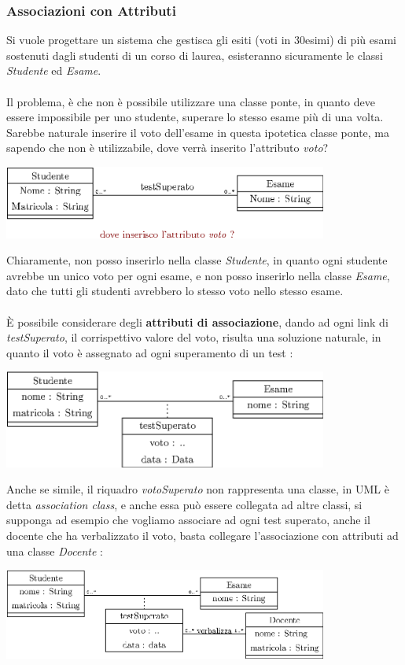 \documentclass[12pt, letterpaper]{article}
\newcommand{\acc}{\\\hphantom{}\\}
\begin{document}
\subsubsection{Associazioni con Attributi}
Si vuole progettare un sistema che gestisca gli esiti (voti in 30esimi) di
più esami sostenuti dagli studenti di un corso di laurea, esisteranno sicuramente
le classi \textit{Studente} ed \textit{Esame}.\acc
Il problema, è che non è possibile utilizzare una classe ponte, in quanto
deve essere impossibile per uno studente, superare lo stesso esame più di una volta. Sarebbe
naturale inserire il voto dell'esame in questa ipotetica classe ponte, ma sapendo che non
è utilizzabile, dove verrà inserito l'attributo \textit{voto}?
\begin{center}
    \includegraphics[width=0.8\textwidth ]{images/votoSbagliato.eps}
\end{center}
Chiaramente, non posso inserirlo nella classe \textit{Studente}, in quanto
ogni studente avrebbe un unico voto per ogni esame, e non posso inserirlo
nella classe \textit{Esame}, dato che tutti gli studenti avrebbero lo
stesso voto nello stesso esame. \acc
È possibile considerare degli \textbf{attributi di associazione}, dando
ad ogni link di \textit{testSuperato}, il corrispettivo valore del voto, risulta
una soluzione naturale, in quanto il voto è assegnato ad ogni superamento di un test :\begin{center}
    \includegraphics[width=0.8\textwidth ]{images/votoGiusto.eps}
\end{center}
Anche se simile, il riquadro \textit{votoSuperato} non rappresenta una
classe, in UML è detta \textit{association class}, e anche essa può essere collegata ad
altre classi, si supponga ad esempio che vogliamo associare ad ogni
test superato, anche il docente che ha verbalizzato il voto, basta
collegare l'associazione con attributi ad una classe \textit{Docente} : \begin{center}
    \includegraphics[width=0.8\textwidth ]{images/conDocente.eps}
\end{center}
\end{document}
